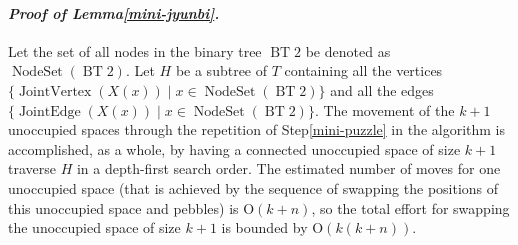 \documentclass[letter,11pt]{article}
\newcommand{\white}{\qquad{\framebox{\rule{0pt}{4pt}}}}
\newcommand{\owari}{\hfill\white}
\theoremstyle{definition}
\theoremstyle{definition}
\DeclareMathOperator{\BT}{BT}
\DeclareMathOperator{\JoiV}{JointVertex}
\DeclareMathOperator{\JoiE}{JointEdge}
\DeclareMathOperator{\NS}{NodeSet}
\newcommand{\1}{\boldmath$~1~$\unboldmath}
\newcommand{\Ord}{\mathrm{O}}
\newcommand{\qedgo}{\vspace{0.35cm}}
\newcommand{\tume}{\hspace*{0.2em}}
\newcommand{\maru}[1]{{\ooalign{\hfill$\small#1$\hfill\crcr\scalebox{1.3}{$\bigcirc$}}}}
\newenvironment{Proofof}[1]{\expandafter
\paragraph{{\it Proof of #1.}}}{\hspace{5mm}\owari\qedgo}
\begin{document}
\begin{Proofof}{Lemma\tume\ref{mini-jyunbi}}
Let the set of all nodes in the binary tree $\BT2$ be denoted as $\NS(\BT2)$.
Let $H$ be a subtree of $T$ containing all the vertices $\{\JoiV(X(x)) \mid x\in \NS(\BT2)\}$ and all the edges $\{\JoiE(X(x)) \mid x\in \NS(\BT2)\}$.  
The movement of the $k+1$ unoccupied spaces through the repetition of Step\tume\ref{mini-puzzle} in the algorithm is accomplished, as a whole, by having a connected unoccupied space of size $k+1$ traverse $H$ in a depth-first search order. 
The estimated number of moves for one unoccupied space (that is achieved by the sequence of swapping the positions of this unoccupied space and pebbles) is $\Ord(k+n)$, so the total effort for swapping the unoccupied space of size $k+1$ is bounded by $\Ord(k(k+n))$.
\end{Proofof}









\end{document}
